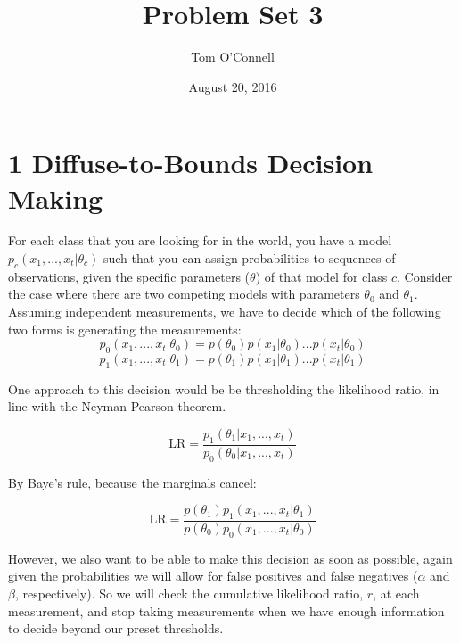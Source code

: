 \documentclass[10pt,letter]{article}
\begin{document}


\title{Problem Set 3}

\author{Tom O'Connell}

\date{August 20, 2016}
 
\maketitle 


\section*{1 Diffuse-to-Bounds Decision Making}

For each class that you are looking for in the world, you have a model $p_c(x_1,...,x_t | \theta_c)$ 
such that you can assign probabilities to sequences of observations, given the specific parameters 
($\theta$) of that model for class $c$.  Consider the case where there are two competing 
models with parameters $\theta_0$ and $\theta_1$.  Assuming independent measurements, we have 
to decide which of the following two forms is generating the measurements:\\

\[ p_0(x_1,...,x_t | \theta_0) = p(\theta_0)p(x_1 | \theta_0)...p(x_t | \theta_0)  \]
\[ p_1(x_1,...,x_t | \theta_1) = p(\theta_1)p(x_1 | \theta_1)...p(x_t | \theta_1)  \]

One approach to this decision would be be thresholding the likelihood ratio, in line with the 
Neyman-Pearson theorem. 

\[ \text{LR} = \frac{p_1(\theta_1 | x_1,...,x_t)}{p_0(\theta_0 | x_1,...,x_t)} \]

By Baye's rule, because the marginals cancel:

\[ \text{LR} = \frac{p(\theta_1)p_1(x_1,...,x_t | \theta_1)}
{p(\theta_0)p_0(x_1,...,x_t | \theta_0)} \]

However, we also want to be able to make this decision as soon as possible, again given the 
probabilities we will allow for false positives and false negatives 
($\alpha$ and $\beta$, respectively).  So we will check the cumulative likelihood ratio, $r$,
at each measurement, and stop taking measurements when we have enough information to decide 
beyond our preset thresholds.
\end{document}
